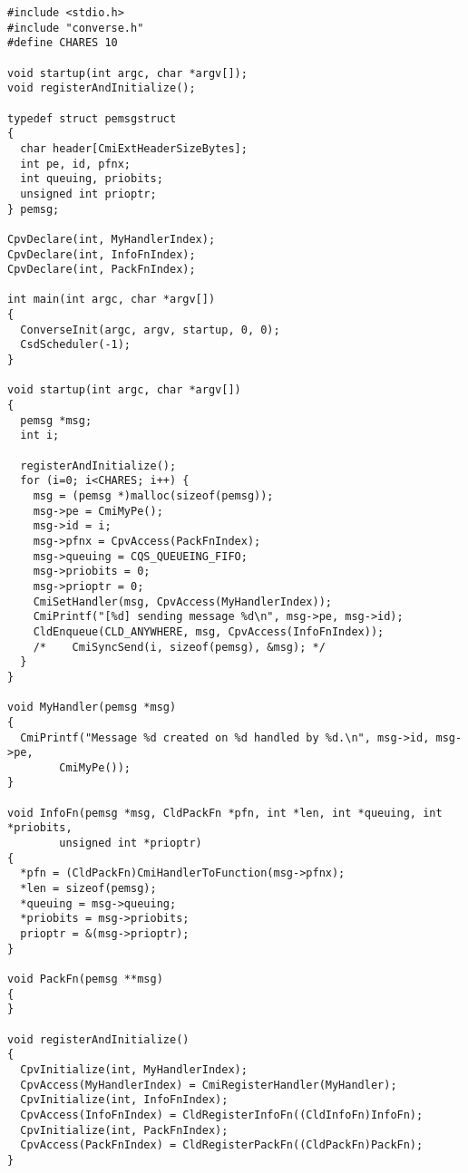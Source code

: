 \begin{verbatim}
#include <stdio.h>
#include "converse.h"
#define CHARES 10

void startup(int argc, char *argv[]);
void registerAndInitialize();

typedef struct pemsgstruct
{
  char header[CmiExtHeaderSizeBytes];
  int pe, id, pfnx;
  int queuing, priobits;
  unsigned int prioptr;
} pemsg;

CpvDeclare(int, MyHandlerIndex);
CpvDeclare(int, InfoFnIndex);
CpvDeclare(int, PackFnIndex);

int main(int argc, char *argv[]) 
{
  ConverseInit(argc, argv, startup, 0, 0);
  CsdScheduler(-1);
}

void startup(int argc, char *argv[])
{
  pemsg *msg;
  int i;
  
  registerAndInitialize();
  for (i=0; i<CHARES; i++) {
    msg = (pemsg *)malloc(sizeof(pemsg));
    msg->pe = CmiMyPe();
    msg->id = i;
    msg->pfnx = CpvAccess(PackFnIndex);
    msg->queuing = CQS_QUEUEING_FIFO;
    msg->priobits = 0;
    msg->prioptr = 0;
    CmiSetHandler(msg, CpvAccess(MyHandlerIndex));
    CmiPrintf("[%d] sending message %d\n", msg->pe, msg->id);
    CldEnqueue(CLD_ANYWHERE, msg, CpvAccess(InfoFnIndex));
    /*    CmiSyncSend(i, sizeof(pemsg), &msg); */
  }
}

void MyHandler(pemsg *msg)
{
  CmiPrintf("Message %d created on %d handled by %d.\n", msg->id, msg->pe, 
	    CmiMyPe());
}

void InfoFn(pemsg *msg, CldPackFn *pfn, int *len, int *queuing, int *priobits, 
	    unsigned int *prioptr)
{
  *pfn = (CldPackFn)CmiHandlerToFunction(msg->pfnx);
  *len = sizeof(pemsg);
  *queuing = msg->queuing;
  *priobits = msg->priobits;
  prioptr = &(msg->prioptr);
}

void PackFn(pemsg **msg)
{
}

void registerAndInitialize()
{
  CpvInitialize(int, MyHandlerIndex);
  CpvAccess(MyHandlerIndex) = CmiRegisterHandler(MyHandler);
  CpvInitialize(int, InfoFnIndex);
  CpvAccess(InfoFnIndex) = CldRegisterInfoFn((CldInfoFn)InfoFn);
  CpvInitialize(int, PackFnIndex);
  CpvAccess(PackFnIndex) = CldRegisterPackFn((CldPackFn)PackFn);
}
\end{verbatim}




